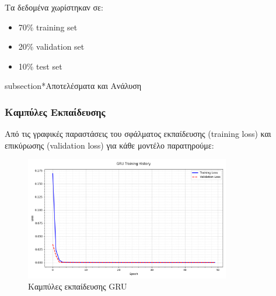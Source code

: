 \documentclass[a4paper,12pt]{article}
\begin{document}
Τα δεδομένα χωρίστηκαν σε:
\begin{itemize}
   \item 70\% training set
   \item 20\% validation set
   \item 10\% test set
\end{itemize}


subsection*{Αποτελέσματα και Ανάλυση}

\subsubsection*{Καμπύλες Εκπαίδευσης}

Από τις γραφικές παραστάσεις του σφάλματος εκπαίδευσης (training loss) και επικύρωσης (validation loss) για κάθε μοντέλο παρατηρούμε:

\begin{figure}[h]
\centering
\includegraphics[width=0.8\textwidth]{gru_loss.png}
\caption{Καμπύλες εκπαίδευσης GRU}
\label{fig:gru_history}
\end{figure}
\end{document}
